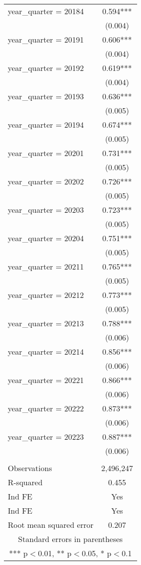 \begin{tabular}{lc}
year\_quarter = 20184 & 0.594*** \\
 & (0.004) \\
year\_quarter = 20191 & 0.606*** \\
 & (0.004) \\
year\_quarter = 20192 & 0.619*** \\
 & (0.004) \\
year\_quarter = 20193 & 0.636*** \\
 & (0.005) \\
year\_quarter = 20194 & 0.674*** \\
 & (0.005) \\
year\_quarter = 20201 & 0.731*** \\
 & (0.005) \\
year\_quarter = 20202 & 0.726*** \\
 & (0.005) \\
year\_quarter = 20203 & 0.723*** \\
 & (0.005) \\
year\_quarter = 20204 & 0.751*** \\
 & (0.005) \\
year\_quarter = 20211 & 0.765*** \\
 & (0.005) \\
year\_quarter = 20212 & 0.773*** \\
 & (0.005) \\
year\_quarter = 20213 & 0.788*** \\
 & (0.006) \\
year\_quarter = 20214 & 0.856*** \\
 & (0.006) \\
year\_quarter = 20221 & 0.866*** \\
 & (0.006) \\
year\_quarter = 20222 & 0.873*** \\
 & (0.006) \\
year\_quarter = 20223 & 0.887*** \\
 & (0.006) \\
 &  \\
Observations & 2,496,247 \\
R-squared & 0.455 \\
Ind FE & Yes \\
Ind FE & Yes \\
 Root mean squared error & 0.207 \\ \hline
\multicolumn{2}{c}{ Standard errors in parentheses} \\
\multicolumn{2}{c}{ *** p$<$0.01, ** p$<$0.05, * p$<$0.1} \\
\end{tabular}
